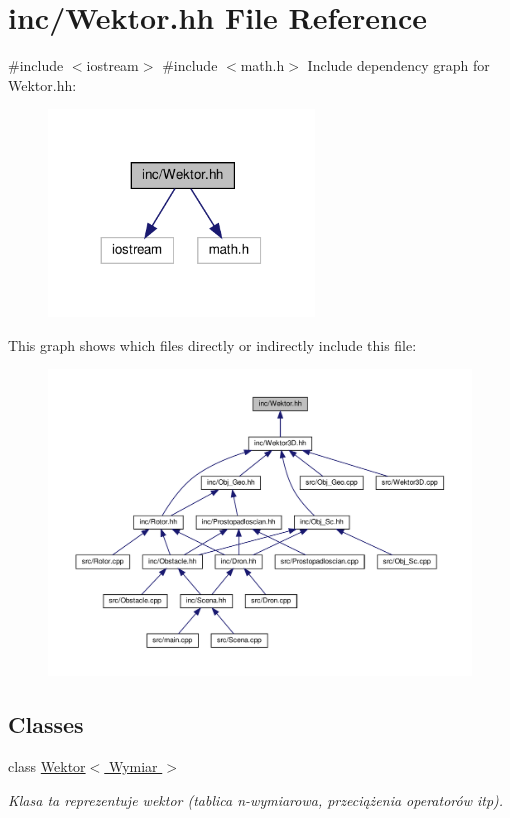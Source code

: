 \hypertarget{_wektor_8hh}{}\section{inc/\+Wektor.hh File Reference}
\label{_wektor_8hh}
{\ttfamily \#include $<$iostream$>$}\newline
{\ttfamily \#include $<$math.\+h$>$}\newline
Include dependency graph for Wektor.\+hh\+:\nopagebreak
\begin{figure}[H]
\begin{center}
\leavevmode
\includegraphics[width=200pt]{_wektor_8hh__incl}
\end{center}
\end{figure}
This graph shows which files directly or indirectly include this file\+:
\nopagebreak
\begin{figure}[H]
\begin{center}
\leavevmode
\includegraphics[width=350pt]{_wektor_8hh__dep__incl}
\end{center}
\end{figure}
\subsection*{Classes}
\begin{DoxyCompactItemize}
\item 
class \hyperlink{class_wektor}{Wektor$<$ Wymiar $>$}
\begin{DoxyCompactList}\small\item\em Klasa ta reprezentuje wektor (tablica n-\/wymiarowa, przeciążenia operatorów itp). \end{DoxyCompactList}\end{DoxyCompactItemize}
